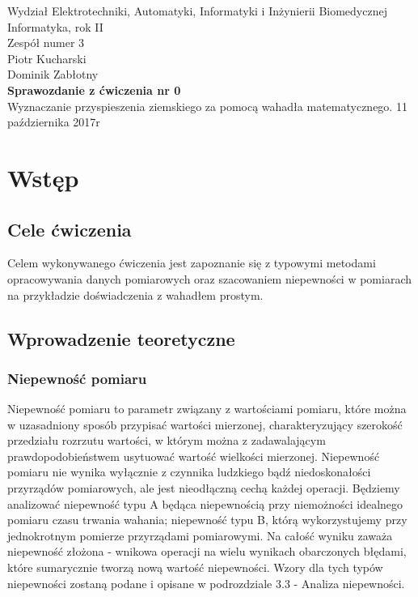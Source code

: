 \documentclass[a4paper,12pts]{article}
\begin{document}
	\thispagestyle{empty}
	\begin{flushleft}
		Wydział Elektrotechniki, Automatyki, Informatyki i Inżynierii Biomedycznej \\
		Informatyka, rok II \\
		Zespół numer 3 \\
		Piotr Kucharski \\
		Dominik Zabłotny \\
		\vspace*{\fill}
		{\large \textbf{Sprawozdanie z ćwiczenia nr 0} } \\
		Wyznaczanie przyspieszenia ziemskiego za pomocą wahadła matematycznego.		
		\vfill	
		11 października 2017r
	\end{flushleft}
	
	\newpage
	
	
	\section{Wstęp}
	
		\subsection{Cele ćwiczenia}
		Celem wykonywanego ćwiczenia jest zapoznanie się z typowymi metodami opracowywania danych pomiarowych oraz szacowaniem niepewności w pomiarach na przykładzie doświadczenia z wahadłem prostym.
	
		\subsection{Wprowadzenie teoretyczne}
	
			\subsubsection{Niepewność pomiaru}
			Niepewność pomiaru to parametr związany z wartościami pomiaru, które można w uzasadniony sposób przypisać wartości mierzonej, charakteryzujący szerokość przedziału rozrzutu wartości, w którym można z zadawalającym prawdopodobieństwem usytuować wartość wielkości mierzonej. Niepewność pomiaru nie wynika wyłącznie z czynnika ludzkiego bądź niedoskonałości przyrządów pomiarowych, ale jest nieodłączną cechą każdej operacji. Będziemy analizować niepewność typu A będąca niepewnością przy niemożności idealnego pomiaru czasu trwania wahania; niepewność typu B, którą wykorzystujemy przy jednokrotnym pomierze przyrządami pomiarowymi. Na całość wyniku zaważa niepewność złożona - wnikowa operacji na wielu wynikach obarczonych błędami, które sumarycznie tworzą nową wartość niepewności. Wzory dla tych typów niepewności zostaną podane i opisane w podrozdziale 3.3 - Analiza niepewności.
			
\end{document}
